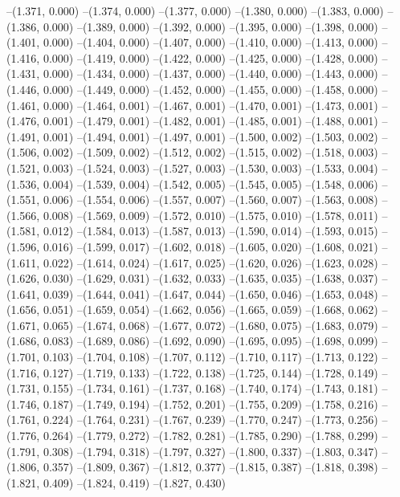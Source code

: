 {--(1.371, 0.000)
--(1.374, 0.000)
--(1.377, 0.000)
--(1.380, 0.000)
--(1.383, 0.000)
--(1.386, 0.000)
--(1.389, 0.000)
--(1.392, 0.000)
--(1.395, 0.000)
--(1.398, 0.000)
--(1.401, 0.000)
--(1.404, 0.000)
--(1.407, 0.000)
--(1.410, 0.000)
--(1.413, 0.000)
--(1.416, 0.000)
--(1.419, 0.000)
--(1.422, 0.000)
--(1.425, 0.000)
--(1.428, 0.000)
--(1.431, 0.000)
--(1.434, 0.000)
--(1.437, 0.000)
--(1.440, 0.000)
--(1.443, 0.000)
--(1.446, 0.000)
--(1.449, 0.000)
--(1.452, 0.000)
--(1.455, 0.000)
--(1.458, 0.000)
--(1.461, 0.000)
--(1.464, 0.001)
--(1.467, 0.001)
--(1.470, 0.001)
--(1.473, 0.001)
--(1.476, 0.001)
--(1.479, 0.001)
--(1.482, 0.001)
--(1.485, 0.001)
--(1.488, 0.001)
--(1.491, 0.001)
--(1.494, 0.001)
--(1.497, 0.001)
--(1.500, 0.002)
--(1.503, 0.002)
--(1.506, 0.002)
--(1.509, 0.002)
--(1.512, 0.002)
--(1.515, 0.002)
--(1.518, 0.003)
--(1.521, 0.003)
--(1.524, 0.003)
--(1.527, 0.003)
--(1.530, 0.003)
--(1.533, 0.004)
--(1.536, 0.004)
--(1.539, 0.004)
--(1.542, 0.005)
--(1.545, 0.005)
--(1.548, 0.006)
--(1.551, 0.006)
--(1.554, 0.006)
--(1.557, 0.007)
--(1.560, 0.007)
--(1.563, 0.008)
--(1.566, 0.008)
--(1.569, 0.009)
--(1.572, 0.010)
--(1.575, 0.010)
--(1.578, 0.011)
--(1.581, 0.012)
--(1.584, 0.013)
--(1.587, 0.013)
--(1.590, 0.014)
--(1.593, 0.015)
--(1.596, 0.016)
--(1.599, 0.017)
--(1.602, 0.018)
--(1.605, 0.020)
--(1.608, 0.021)
--(1.611, 0.022)
--(1.614, 0.024)
--(1.617, 0.025)
--(1.620, 0.026)
--(1.623, 0.028)
--(1.626, 0.030)
--(1.629, 0.031)
--(1.632, 0.033)
--(1.635, 0.035)
--(1.638, 0.037)
--(1.641, 0.039)
--(1.644, 0.041)
--(1.647, 0.044)
--(1.650, 0.046)
--(1.653, 0.048)
--(1.656, 0.051)
--(1.659, 0.054)
--(1.662, 0.056)
--(1.665, 0.059)
--(1.668, 0.062)
--(1.671, 0.065)
--(1.674, 0.068)
--(1.677, 0.072)
--(1.680, 0.075)
--(1.683, 0.079)
--(1.686, 0.083)
--(1.689, 0.086)
--(1.692, 0.090)
--(1.695, 0.095)
--(1.698, 0.099)
--(1.701, 0.103)
--(1.704, 0.108)
--(1.707, 0.112)
--(1.710, 0.117)
--(1.713, 0.122)
--(1.716, 0.127)
--(1.719, 0.133)
--(1.722, 0.138)
--(1.725, 0.144)
--(1.728, 0.149)
--(1.731, 0.155)
--(1.734, 0.161)
--(1.737, 0.168)
--(1.740, 0.174)
--(1.743, 0.181)
--(1.746, 0.187)
--(1.749, 0.194)
--(1.752, 0.201)
--(1.755, 0.209)
--(1.758, 0.216)
--(1.761, 0.224)
--(1.764, 0.231)
--(1.767, 0.239)
--(1.770, 0.247)
--(1.773, 0.256)
--(1.776, 0.264)
--(1.779, 0.272)
--(1.782, 0.281)
--(1.785, 0.290)
--(1.788, 0.299)
--(1.791, 0.308)
--(1.794, 0.318)
--(1.797, 0.327)
--(1.800, 0.337)
--(1.803, 0.347)
--(1.806, 0.357)
--(1.809, 0.367)
--(1.812, 0.377)
--(1.815, 0.387)
--(1.818, 0.398)
--(1.821, 0.409)
--(1.824, 0.419)
--(1.827, 0.430)
}
